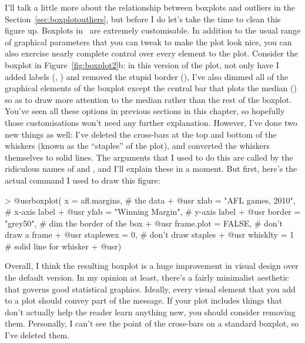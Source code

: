 I'll talk a little more about the relationship between boxplots and outliers in the Section~\ref{sec:boxplotoutliers}, but before I do let's take the time to clean this figure up. Boxplots in \R\ are extremely customisable. In addition to the usual range of graphical parameters that you can tweak to make the plot look nice, you can also exercise nearly complete control over every element to the plot. Consider the boxplot in Figure~\ref{fig:boxplot2}b: in this version of the plot, not only have I added labels (, ) and removed the stupid border (), I've also dimmed all of the graphical elements of the boxplot except the central bar that plots the median () so as to draw more attention to the median rather than the rest of the boxplot. You've seen all these options in previous sections in this chapter, so hopefully those customisations won't need any further explanation. However, I've done two new things as well: I've deleted the cross-bars at the top and bottom of the whiskers (known as the ``staples'' of the plot), and converted the whiskers themselves to solid lines. The arguments that I used to do this are called by the ridiculous names of  and , and I'll explain these in a moment. But first, here's the actual command I used to draw this figure:
\begin{rblock1}
> @usr{boxplot( x = afl.margins,}           # the data
+ @usr{         xlab = "AFL games, 2010",}  # x-axis label
+ @usr{         ylab = "Winning Margin",}   # y-axis label
+ @usr{         border = "grey50",}         # dim the border of the box
+ @usr{         frame.plot = FALSE,}        # don't draw a frame
+ @usr{         staplewex = 0,}             # don't draw staples
+ @usr{         whisklty = 1 }              # solid line for whisker 
+ @usr{)}
\end{rblock1}
Overall, I think the resulting boxplot is a huge improvement in visual design over the default version. In my opinion at least, there's a fairly minimalist aesthetic that governs good statistical graphics. Ideally, every visual element that you add to a plot should convey part of the message. If your plot includes things that don't actually help the reader learn anything new, you should consider removing them. Personally, I can't see the point of the cross-bars on a standard boxplot, so I've deleted them.

